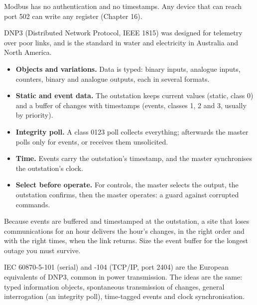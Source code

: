 Modbus has no authentication and no timestamps. Any device that can reach port 502 can write any register (Chapter 16).

DNP3 (Distributed Network Protocol, IEEE 1815) was designed for telemetry over poor links, and is the standard in water and electricity in Australia and North America.
\begin{itemize}
\item \textbf{Objects and variations.} Data is typed: binary inputs, analogue inputs, counters, binary and analogue outputs, each in several formats.
\item \textbf{Static and event data.} The outstation keeps current values (static, class 0) and a buffer of changes with timestamps (events, classes 1, 2 and 3, usually by priority).
\item \textbf{Integrity poll.} A class 0123 poll collects everything; afterwards the master polls only for events, or receives them unsolicited.
\item \textbf{Time.} Events carry the outstation's timestamp, and the master synchronises the outstation's clock.
\item \textbf{Select before operate.} For controls, the master selects the output, the outstation confirms, then the master operates: a guard against corrupted commands.
\end{itemize}
 Because events are buffered and timestamped at the outstation, a site that loses communications for an hour delivers the hour's changes, in the right order and with the right times, when the link returns. Size the event buffer for the longest outage you must survive.

IEC 60870-5-101 (serial) and -104 (TCP/IP, port 2404) are the European equivalents of DNP3, common in power transmission. The ideas are the same: typed information objects, spontaneous transmission of changes, general interrogation (an integrity poll), time-tagged events and clock synchronisation.

